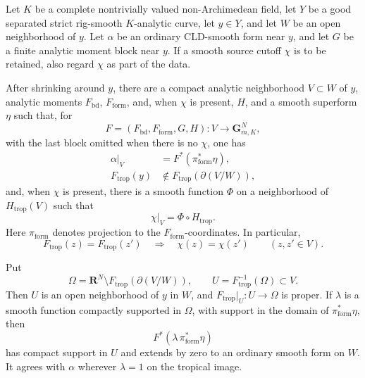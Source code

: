 
\begin{lemma}
\label{lem:p21p3-gf-legal-source-localization}
Let \(K\) be a complete nontrivially valued non-Archimedean field, let
\(Y\) be a good separated strict rig-smooth \(K\)-analytic curve, let
\(y\in Y\), and let \(W\) be an open neighborhood of \(y\).  Let \(\alpha\)
be an ordinary CLD-smooth form near \(y\), and let \(G\) be a finite analytic
moment block near \(y\).  If a smooth source cutoff \(\chi\) is to be retained,
also regard \(\chi\) as part of the data.

After shrinking around \(y\), there are a compact analytic neighborhood
\(V\subset W\) of \(y\), analytic moments \(F_{\mathrm{bd}}\),
\(F_{\mathrm{form}}\), and, when \(\chi\) is present, \(H\), and a smooth
superform \(\eta\) such that, for
\[
 F=(F_{\mathrm{bd}},F_{\mathrm{form}},G,H):V\longrightarrow
       \mathbf G_{m,K}^{N},
\]
with the last block omitted when there is no \(\chi\), one has
\begin{align}
 \alpha|_V&=F^*(\pi_{\mathrm{form}}^*\eta),
 \label{eq:p21p3-gf-source-local-form}\\
 F_{\mathrm{trop}}(y)&\notin
       F_{\mathrm{trop}}(\partial(V/W)),
 \label{eq:p21p3-gf-source-local-boundary}
\end{align}
and, when \(\chi\) is present, there is a smooth function \(\Phi\) on a
neighborhood of \(H_{\mathrm{trop}}(V)\) such that
\begin{equation}
 \chi|_V=\Phi\circ H_{\mathrm{trop}}.
 \label{eq:p21p3-gf-source-cutoff-factorization}
\end{equation}
Here \(\pi_{\mathrm{form}}\) denotes projection to the
\(F_{\mathrm{form}}\)-coordinates.  In particular,
\begin{equation}
 F_{\mathrm{trop}}(z)=F_{\mathrm{trop}}(z')
       \quad\Longrightarrow\quad \chi(z)=\chi(z')
       \qquad(z,z'\in V).
 \label{eq:p21p3-gf-source-cutoff-fibre-constancy}
\end{equation}

Put
\begin{equation}
 \Omega=\mathbf R^N\setminus
       F_{\mathrm{trop}}(\partial(V/W)),
 \qquad U=F_{\mathrm{trop}}^{-1}(\Omega)\subset V.
 \label{eq:p21p3-gf-source-local-omega}
\end{equation}
Then \(U\) is an open neighborhood of \(y\) in \(W\), and
\(F_{\mathrm{trop}}|_U:U\to\Omega\) is proper.  If \(\lambda\) is a smooth
function compactly supported in \(\Omega\), with support in the domain of
\(\pi_{\mathrm{form}}^*\eta\), then
\[
 F^*(\lambda\,\pi_{\mathrm{form}}^*\eta)
\]
has compact support in \(U\) and extends by zero to an ordinary smooth form
on \(W\).  It agrees with \(\alpha\) wherever \(\lambda=1\) on the tropical
image.


\end{lemma}
